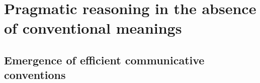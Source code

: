 \documentclass{article} %
\begin{document}




\section{Pragmatic reasoning in the absence of conventional meanings}


\subsection{Emergence of efficient communicative conventions}
\label{sec:emergence}
\end{document}
